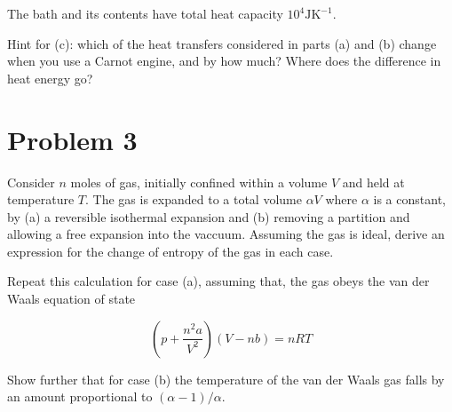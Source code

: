 \documentclass[10pt]{article}
\begin{document}
The bath and its contents have total heat capacity $10^4 \mathrm{J}\mathrm K^{-1}$.

Hint for (c): which of the heat transfers considered in parts (a) and (b) change when you use a Carnot engine, and by how much? Where does the difference in heat energy go?
\pagebreak 
\section*{Problem 3}

Consider $n$ moles of gas, initially confined within a volume $V$ and held at temperature $T$. The gas is expanded to a total volume $\alpha V$ where $\alpha$ is a constant, by (a) a reversible isothermal expansion and (b) removing a partition and allowing a free expansion into the vaccuum. Assuming the gas is ideal, derive an expression for the change of entropy of the gas in each case.

Repeat this calculation for case (a), assuming that, the gas obeys the van der Waals equation of state

\[ \left(p + \frac{n^2a}{V^2}\right)(V - nb) = nRT\]

Show further that for case (b) the temperature of the van der Waals gas falls by an amount proportional to $(\alpha - 1)/\alpha$.
\end{document}
